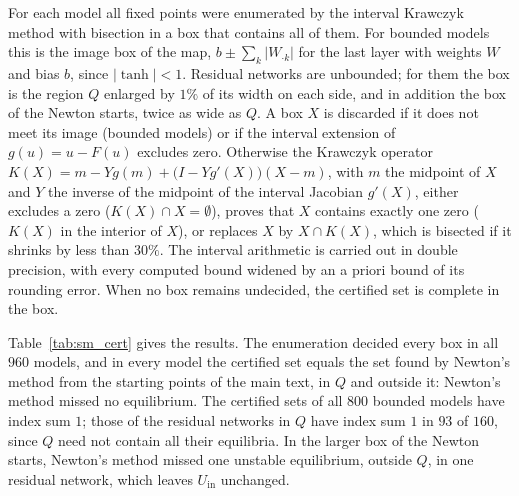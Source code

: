 \documentclass[aip,cha,preprint,amsmath,amssymb,longbibliography]{revtex4-2}
\newcommand{\Uin}{U_{\mathrm{in}}}
\begin{document}
For each model all fixed points were enumerated by the interval Krawczyk method with
bisection\cite{Krawczyk1969Newton,Moore2009Interval} in a box that contains all of them. For bounded models this is the
image box of the map, $b\pm\sum_k|W_{\cdot k}|$ for the last layer with weights $W$ and bias $b$, since $|\tanh|<1$.
Residual networks are unbounded; for them the box is the region $Q$ enlarged by $1\%$ of its width on each side, and in
addition the box of the Newton starts, twice as wide as $Q$. A box $X$ is discarded if it does not meet its image (bounded
models) or if the interval extension of $g(u)=u-F(u)$ excludes zero. Otherwise the Krawczyk operator
$K(X)=m-Yg(m)+\bigl(I-Yg'(X)\bigr)(X-m)$, with $m$ the midpoint of $X$ and $Y$ the inverse of the midpoint of the interval
Jacobian $g'(X)$, either excludes a zero ($K(X)\cap X=\emptyset$), proves that $X$ contains exactly one zero ($K(X)$ in the
interior of $X$), or replaces $X$ by $X\cap K(X)$, which is bisected if it shrinks by less than $30\%$. The interval
arithmetic is carried out in double precision, with every computed bound widened by an a priori bound of its rounding error.
When no box remains undecided, the certified set is complete in the box.

Table~\ref{tab:sm_cert} gives the results. The enumeration decided every box in all $960$ models, and in every model the
certified set equals the set found by Newton's method from the starting points of the main text, in $Q$ and outside it:
Newton's method missed no equilibrium. The certified sets of all $800$ bounded models have index sum $1$; those of the
residual networks in $Q$ have index sum $1$ in $93$ of $160$, since $Q$ need not contain all their equilibria. In the larger
box of the Newton starts, Newton's method missed one unstable equilibrium, outside $Q$, in one residual network, which
leaves $\Uin$ unchanged.




\end{document}
